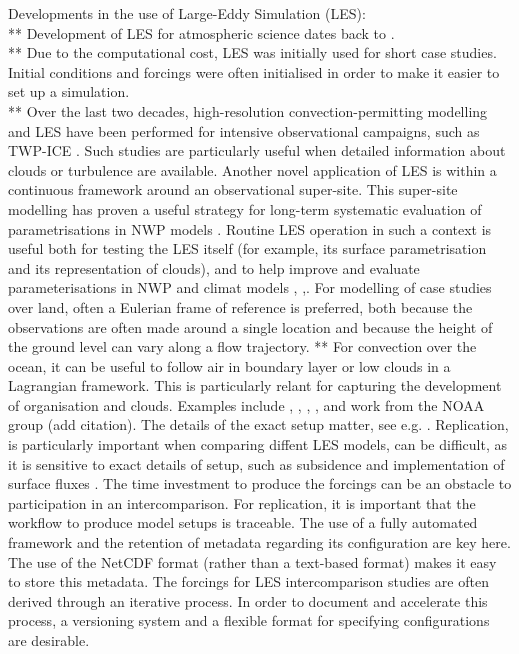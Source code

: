 \documentclass[a4paper,11pt]{article}
\begin{document}
Developments in the use of Large-Eddy Simulation (LES): \\
** Development of LES for atmospheric science dates back to \cite{deardorff1970}. \\
** Due to the computational cost, LES was initially used for short
case studies. Initial conditions and forcings were often initialised in order
to make it easier to set up a simulation. \\
** Over the last two decades, high-resolution convection-permitting
modelling and LES have been performed for intensive observational
campaigns, such as TWP-ICE \citep{fridlind2012}. Such studies are
particularly useful when detailed information about clouds or
turbulence are available. Another novel application of LES is within a
continuous framework around an observational super-site. This
super-site modelling has proven a useful strategy for long-term
systematic evaluation of parametrisations in NWP models
\cite{neggers2012}. Routine LES operation in such a context is useful
both for testing the LES itself (for example, its surface
parametrisation and its representation of clouds), and to help improve
and evaluate parameterisations in NWP and climat models
\cite{schalkwijk2015}, \cite{laar2019},\cite{gustafson2020}. For
modelling of case studies over land, often a Eulerian frame of
reference is preferred, both because the observations are often made
around a single location and because the height of the ground level can
vary along a flow trajectory.
** For convection over the ocean, it can be useful to follow air in
boundary layer or low clouds in a Lagrangian framework. This is
particularly relant for capturing the development of organisation and
clouds. Examples include \cite{bretherton1999}, \cite{roode2016},
\cite{tomassini2017}, \cite{mohrmann2019}, \cite{neggers2019} and work
from the NOAA group (add citation). The details of the exact setup matter, see e.g.
\cite{smalley2019}. Replication, is particularly important when comparing diffent LES
models, can be difficult, as it is sensitive to
exact details of setup, such as subsidence
\citep{hohenegger2013,kurowski2020} and implementation of surface
fluxes \citep{stevens2001}.
The time investment to produce the forcings can be an obstacle to
participation in an intercomparison. For replication, it is important
that the workflow to produce model setups is traceable. The use of a
fully automated framework and the retention of metadata regarding its
configuration are key here. The use of the
NetCDF format (rather than a text-based format) makes it easy to store
this metadata. The forcings for LES intercomparison studies are often derived
through an iterative process. In order to document and accelerate this
process, a versioning system and a flexible format for specifying
configurations are desirable.
\end{document}
